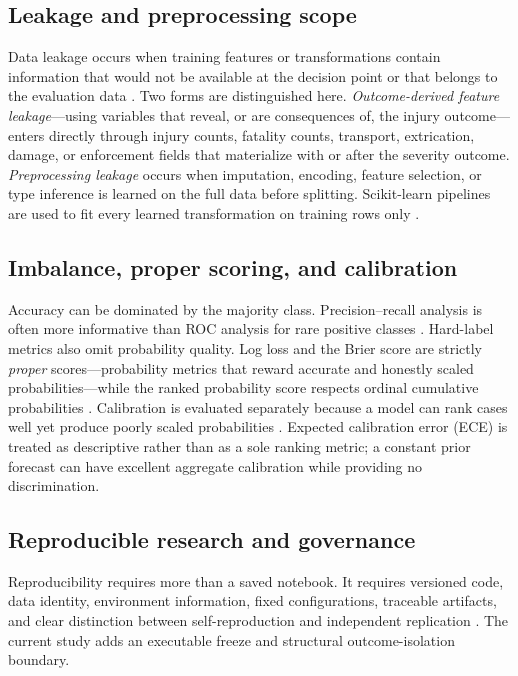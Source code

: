 \documentclass[11pt,letterpaper]{article}
\begin{document}
\subsection{Leakage and preprocessing scope}
Data leakage occurs when training features or transformations contain information that would not be available at the decision point or that belongs to the evaluation data \citep{kaufman2012}. Two forms are distinguished here. \emph{Outcome-derived feature leakage}---using variables that reveal, or are consequences of, the injury outcome---enters directly through injury counts, fatality counts, transport, extrication, damage, or enforcement fields that materialize with or after the severity outcome. \emph{Preprocessing leakage} occurs when imputation, encoding, feature selection, or type inference is learned on the full data before splitting. Scikit-learn pipelines are used to fit every learned transformation on training rows only \citep{pedregosa2011}.

\subsection{Imbalance, proper scoring, and calibration}
Accuracy can be dominated by the majority class. Precision--recall analysis is often more informative than ROC analysis for rare positive classes \citep{saito2015}. Hard-label metrics also omit probability quality. Log loss and the Brier score are strictly \emph{proper} scores---probability metrics that reward accurate and honestly scaled probabilities---while the ranked probability score respects ordinal cumulative probabilities \citep{gneiting2007,epstein1969}. Calibration is evaluated separately because a model can rank cases well yet produce poorly scaled probabilities \citep{guo2017,vancalster2019}. Expected calibration error (ECE) is treated as descriptive rather than as a sole ranking metric; a constant prior forecast can have excellent aggregate calibration while providing no discrimination.

\subsection{Reproducible research and governance}
Reproducibility requires more than a saved notebook. It requires versioned code, data identity, environment information, fixed configurations, traceable artifacts, and clear distinction between self-reproduction and independent replication \citep{pineau2021,nasem2019}. The current study adds an executable freeze and structural outcome-isolation boundary.
\end{document}
